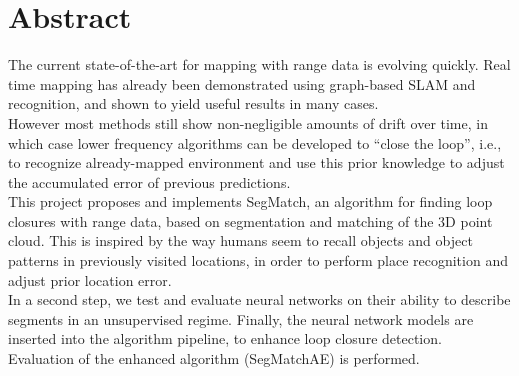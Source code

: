 \chapter*{Abstract}

The current state-of-the-art for mapping with range data is evolving quickly. Real time mapping has already been demonstrated using graph-based SLAM and recognition, and shown to yield useful results in many cases.\\

However most methods still show non-negligible amounts of drift over time, in which case lower frequency algorithms can be developed to “close the loop”, i.e., to recognize already-mapped environment and use this prior knowledge to adjust the accumulated error of previous predictions.\\

This project proposes and implements SegMatch, an algorithm for finding loop closures with range data, based on segmentation and matching of the 3D point cloud. This is inspired by the way humans seem to recall objects and object patterns in previously visited locations, in order to perform place recognition and adjust prior location error.\\

In a second step, we test and evaluate neural networks on their ability to describe segments in an unsupervised regime. Finally, the neural network models are inserted into the algorithm pipeline, to enhance loop closure detection. Evaluation of the enhanced algorithm (SegMatchAE) is performed.\\
